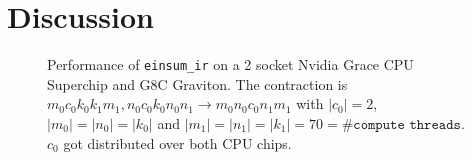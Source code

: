 \section{Discussion}

\begin{figure}
  \caption{
    Performance of \texttt{einsum\_ir} on a 2 socket Nvidia Grace CPU Superchip and G8C Graviton.
    The contraction is $m_0c_0k_0k_1m_1, n_0c_0k_0n_0n_1 \rightarrow m_0n_0c_0n_1m_1$ with $|c_0|=2$, $|m_0|=|n_0|=|k_0|$ and $|m_1|=|n_1|=|k_1|=70=\texttt{\#compute threads}$.
    $c_0$ got distributed over both CPU chips.
    }
  \label{c_perf}
\end{figure}
